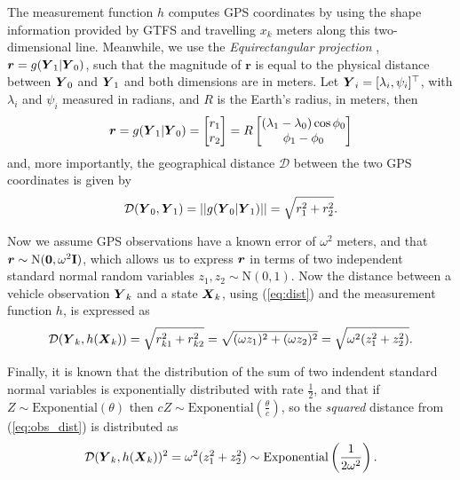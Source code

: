 The measurement function $h$ computes GPS coordinates by using the 
shape information provided by GTFS and travelling $x_k$ meters along 
this two-dimensional line.
Meanwhile, we use the \emph{Equirectangular projection} \citep{Snyder_1998},
$\boldsymbol{r} = g(\mbox{$\boldsymbol{Y}$}_1 | \mbox{$\boldsymbol{Y}$}_0)$,
such that the magnitude of $\boldsymbol{r}$ is equal to the physical distance
between $\mbox{$\boldsymbol{Y}$}_0$ and $\mbox{$\boldsymbol{Y}$}_1$ and both dimensions are in meters.
Let $\mbox{$\boldsymbol{Y}$}_i = [\lambda_i, \psi_i]^\top$,
with $\lambda_i$ and $\psi_i$ measured in radians,  
and $R$ is the Earth's radius, in meters, then
\begin{equation}
\boldsymbol{r} = 
g(\mbox{$\boldsymbol{Y}$}_1 | \mbox{$\boldsymbol{Y}$}_0) = 
    \begin{bmatrix}
        r_1 \\ r_2
    \end{bmatrix} =
    R \begin{bmatrix}
        (\lambda_1 - \lambda_0)\cos\phi_0 \\
        \phi_1 - \phi_0
    \end{bmatrix}
\end{equation}
and, more importantly, the geographical distance $\mathcal{D}$ between the two 
GPS coordinates is given by
\begin{equation}
\label{eq:dist}
\mathcal{D}(\mbox{$\boldsymbol{Y}$}_0, \mbox{$\boldsymbol{Y}$}_1) = ||g(\mbox{$\boldsymbol{Y}$}_0 | \mbox{$\boldsymbol{Y}$}_1)|| = \sqrt{r_1^2 + r_2^2}.
\end{equation}


Now we assume GPS observations have a known error of $\omega^2$ meters,
and that \mbox{$\boldsymbol{r} \sim \mathrm{N}(\boldsymbol{0}, \omega^2\mathbf{I})$},
which allows us to express $\boldsymbol{r}$ in terms of two independent
standard normal random variables $z_1, z_2 \sim \mathrm{N}(0,1)$.
Now the distance between a vehicle observation $\mbox{$\boldsymbol{Y}$}_k$
and a state $\mbox{$\boldsymbol{X}$}_k$, using (\ref{eq:dist}) and the measurement function $h$,
is expressed as
\begin{equation}
\label{eq:obs_dist}
\mathcal{D}(\mbox{$\boldsymbol{Y}$}_k, h(\mbox{$\boldsymbol{X}$}_k)) = \sqrt{r_{k1}^2 + r_{k2}^2} 
    = \sqrt{(\omega z_1)^2 + (\omega z_2)^2}
    = \sqrt{\omega^2 (z_1^2 + z_2^2)}.
\end{equation}

Finally, it is known that the distribution of the sum of two indendent 
standard normal variables is exponentially distributed with rate $\frac{1}{2}$,
and that if $Z \sim \mathrm{Exponential}(\theta)$ then
$cZ \sim \mathrm{Exponential}(\frac{\theta}{c})$,
so the \emph{squared} distance from (\ref{eq:obs_dist}) is distributed as
\begin{equation}
\label{eq:obs_exp}
\mathcal{D}(\mbox{$\boldsymbol{Y}$}_k, h(\mbox{$\boldsymbol{X}$}_k))^2 =
\omega^2(z_1^2 + z_2^2) \sim \mathrm{Exponential}\left(\frac{1}{2\omega^2}\right).
\end{equation}

